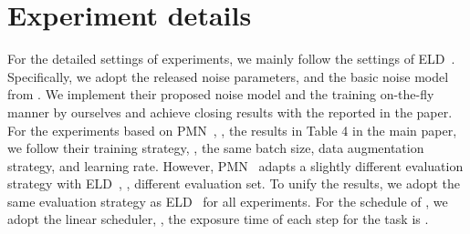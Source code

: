 \documentclass[10pt,twocolumn,letterpaper]{article}
\begin{document}
\section{Experiment details}
For the detailed settings of experiments, we mainly follow the settings of ELD~\cite{wei2020physics}. Specifically, we adopt the released noise parameters, and the basic noise model  from \cite{wei2020physics}. We implement their proposed noise model  and the training on-the-fly manner by ourselves and achieve closing results with the reported in the paper. For the experiments based on PMN~\cite{feng2022learnability}, \eg, the results in Table 4 in the main paper, we follow their training strategy, \eg, the same batch size, data augmentation strategy, and learning rate. However, PMN~\cite{feng2022learnability} adapts a slightly different evaluation strategy with ELD~\cite{wei2020physics}, \eg, different evaluation set. To unify the results, we adopt the same evaluation strategy as ELD~\cite{wei2020physics} for all experiments. 
For the schedule of , we adopt the linear scheduler, \eg, the exposure time of each step for the  task is .
\end{document}
